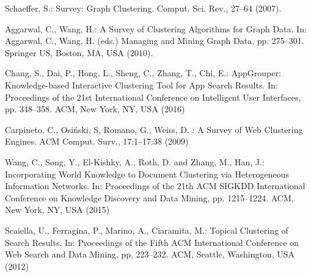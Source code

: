 \documentclass[runningheads]{llncs}
\begin{document}
\begin{thebibliography}{8}
Schaeffer, S.: Survey: Graph Clustering. Comput. Sci. Rev., 27--64 (2007). 

Aggarwal, C., Wang, H.: A Survey of Clustering Algorithms for Graph Data. In: Aggarwal, C., Wang, H. (eds.) Managing and Mining Graph Data, pp. 275--301.
Springer US, Boston, MA, USA (2010). 

Chang, S., Dai, P., Hong, L., Sheng, C., Zhang, T., Chi, E.: AppGrouper: Knowledge-based Interactive Clustering Tool for App Search Results. In: Proceedings of the 21st International Conference on Intelligent User Interfaces, pp. 348--358. ACM, New York, NY, USA (2016) 

Carpineto, C., Osi\'{n}ski, S, Romano, G., Weiss, D. : A Survey of Web Clustering Engines. ACM Comput. Surv., 17:1--17:38 (2009)

Wang, C., Song, Y., El-Kishky, A., Roth, D. and Zhang, M., Han, J.: Incorporating World Knowledge to Document Clustering via Heterogeneous Information Networks. In: Proceedings of the 21th ACM SIGKDD International Conference on Knowledge Discovery and Data Mining, pp. 1215--1224. ACM, New York, NY, USA (2015)

Scaiella, U., Ferragina, P., Marino, A., Ciaramita, M.: Topical Clustering of Search Results. In: Proceedings of the Fifth ACM International Conference on Web Search and Data Mining, pp. 223--232. ACM, Seattle, Washington, USA (2012) 


\end{thebibliography}

\end{document}

